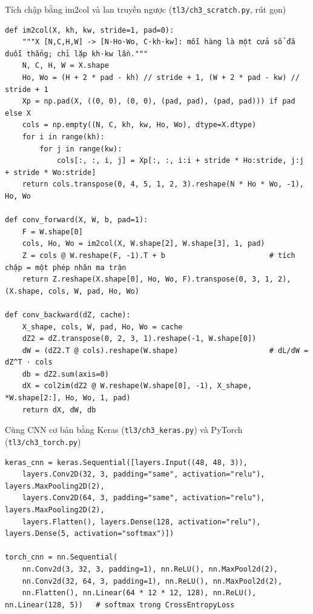 \begin{code}{Tích chập bằng im2col và lan truyền ngược (\texttt{tl3/ch3\_scratch.py}, rút gọn)}
\label{lst:ch3-im2col}
\begin{verbatim}
def im2col(X, kh, kw, stride=1, pad=0):
    """X [N,C,H,W] -> [N·Ho·Wo, C·kh·kw]: mỗi hàng là một cửa sổ đã duỗi thẳng; chỉ lặp kh·kw lần."""
    N, C, H, W = X.shape
    Ho, Wo = (H + 2 * pad - kh) // stride + 1, (W + 2 * pad - kw) // stride + 1
    Xp = np.pad(X, ((0, 0), (0, 0), (pad, pad), (pad, pad))) if pad else X
    cols = np.empty((N, C, kh, kw, Ho, Wo), dtype=X.dtype)
    for i in range(kh):
        for j in range(kw):
            cols[:, :, i, j] = Xp[:, :, i:i + stride * Ho:stride, j:j + stride * Wo:stride]
    return cols.transpose(0, 4, 5, 1, 2, 3).reshape(N * Ho * Wo, -1), Ho, Wo

def conv_forward(X, W, b, pad=1):
    F = W.shape[0]
    cols, Ho, Wo = im2col(X, W.shape[2], W.shape[3], 1, pad)
    Z = cols @ W.reshape(F, -1).T + b                        # tích chập = một phép nhân ma trận
    return Z.reshape(X.shape[0], Ho, Wo, F).transpose(0, 3, 1, 2), (X.shape, cols, W, pad, Ho, Wo)

def conv_backward(dZ, cache):
    X_shape, cols, W, pad, Ho, Wo = cache
    dZ2 = dZ.transpose(0, 2, 3, 1).reshape(-1, W.shape[0])
    dW = (dZ2.T @ cols).reshape(W.shape)                     # dL/dW = dZ^T · cols
    db = dZ2.sum(axis=0)
    dX = col2im(dZ2 @ W.reshape(W.shape[0], -1), X_shape, *W.shape[2:], Ho, Wo, 1, pad)
    return dX, dW, db
\end{verbatim}
\end{code}

\begin{code}{Cùng CNN cơ bản bằng Keras (\texttt{tl3/ch3\_keras.py}) và PyTorch (\texttt{tl3/ch3\_torch.py})}
\label{lst:ch3-keras-torch}
\begin{verbatim}
keras_cnn = keras.Sequential([layers.Input((48, 48, 3)),
    layers.Conv2D(32, 3, padding="same", activation="relu"), layers.MaxPooling2D(2),
    layers.Conv2D(64, 3, padding="same", activation="relu"), layers.MaxPooling2D(2),
    layers.Flatten(), layers.Dense(128, activation="relu"), layers.Dense(5, activation="softmax")])

torch_cnn = nn.Sequential(
    nn.Conv2d(3, 32, 3, padding=1), nn.ReLU(), nn.MaxPool2d(2),
    nn.Conv2d(32, 64, 3, padding=1), nn.ReLU(), nn.MaxPool2d(2),
    nn.Flatten(), nn.Linear(64 * 12 * 12, 128), nn.ReLU(), nn.Linear(128, 5))   # softmax trong CrossEntropyLoss
\end{verbatim}
\end{code}

